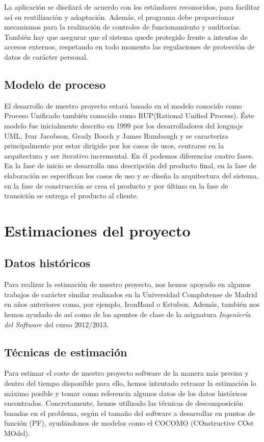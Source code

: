 \documentclass[11pt, a4paper, twoside, titlepage]{article}
\begin{document}
			La aplicación se diseñará de acuerdo con los estándares reconocidos, para facilitar así su reutilización y adaptación. Además, el programa debe proporcionar mecanismos para la realización de controles de funcionamiento y auditorías. También hay que asegurar que el sistema quede protegido frente a intentos de accesos externos, respetando en todo momento las regulaciones de protección de datos de carácter personal.

		\subsection{Modelo de proceso}
		El desarrollo de nuestro proyecto estará basado en el modelo conocido como Proceso Unificado también conocido como RUP(Rational Unified Process). Éste modelo fue inicialmente descrito en 1999 por los desarrolladores del lenguaje UML, Ivar Jacobson, Grady Booch y James Rumbaugh y se caracteriza principalmente por estar dirigido por los casos de usos, centrarse en la arquitectura y ser iterativo incremental. En él podemos diferenciar cuatro fases. En la fase de inicio se desarrolla una descripción del producto final, en la fase de elaboración se especifican los casos de uso y se diseña la arquitectura del sistema, en la fase de construcción se crea el producto y por último en la fase de transición se entrega el producto al cliente.

	\section{Estimaciones del proyecto}
		\subsection{Datos históricos}
		Para realizar la estimación de nuestro proyecto, nos hemos apoyado en algunos trabajos de carácter similar realizados en la Universidad Complutense de Madrid en años anteriores como, por ejemplo, IronHand o Estubox. Además, también nos hemos ayudado de \cite{PSMAN} así como de los apuntes de clase de la asignatura \textit{Ingeniería del Software} del curso 2012/2013.
		\subsection{Técnicas de estimación}
		Para estimar el coste de nuestro proyecto software de la manera más precisa y dentro del tiempo disponible para ello, hemos intentado retrasar la estimación lo máximo posible y tomar como referencia algunos datos de los datos históricos encontrados. Concretamente, hemos utilizado las técnicas de descomposición basadas en el problema, según el tamaño del software a desarrollar en puntos de función (PF), ayudándonos de modelos como el COCOMO (COnstructive COst MOdel).
\end{document}
